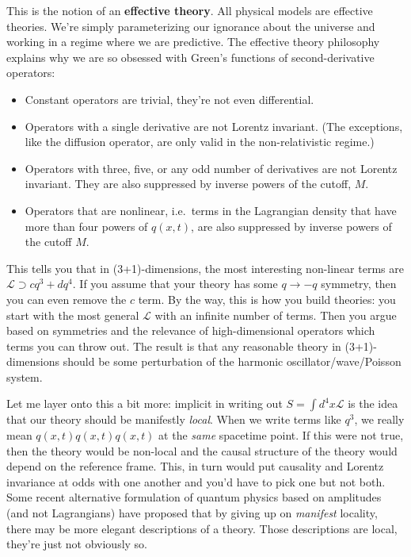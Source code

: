 This is the notion of an \textbf{effective theory}. All physical models are effective theories. We're simply parameterizing our ignorance about the universe and working in a regime where we are predictive. The effective theory philosophy explains why we are so obsessed with Green's functions of second-derivative operators:
\begin{itemize}
	\item Constant operators are trivial, they're not even differential.
	\item Operators with a single derivative are not Lorentz invariant. (The exceptions, like the diffusion operator, are only valid in the non-relativistic regime.)
	\item Operators with three, five, or any odd number of derivatives are not Lorentz invariant. They are also suppressed by inverse powers of the cutoff, $M$.
	\item Operators that are nonlinear, i.e.~terms in the Lagrangian density that have more than four powers of $q(x,t)$, are also suppressed by inverse powers of the cutoff $M$.
\end{itemize}
This tells you that in (3+1)-dimensions, the most interesting non-linear terms are $\mathcal L \supset cq^3+ dq^4$. If you assume that your theory has some $q\to -q$ symmetry, then you can even remove the $c$ term. By the way, this is how you build theories: you start with the most general $\mathcal L$ with an infinite number of terms. Then you argue based on symmetries and the relevance of high-dimensional operators which terms you can throw out. The result is that any reasonable theory in (3+1)-dimensions should be some perturbation of the harmonic oscillator/wave/Poisson system.

Let me layer onto this a bit more: implicit in writing out $S=\int d^4x\mathcal L$ is the idea that our theory should be manifestly \emph{local}. When we write terms like $q^3$, we really mean $q(x,t)q(x,t)q(x,t)$ at the \emph{same} spacetime point. If this were not true, then the theory would be non-local and the causal structure of the theory would depend on the reference frame. This, in turn would put causality and Lorentz invariance at odds with one another and you'd have to pick one but not both. Some recent alternative formulation of quantum physics based on amplitudes (and not Lagrangians) have proposed that by giving up on \emph{manifest} locality, there may be more elegant descriptions of a theory. Those descriptions are local, they're just not obviously so.

















